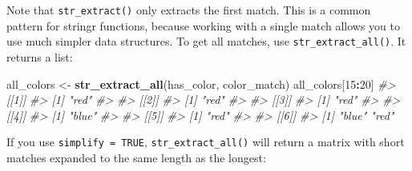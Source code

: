 \documentclass[]{book}
\newenvironment{Shaded}{\begin{snugshade}}{\end{snugshade}}
\newcommand{\CommentTok}[1]{\textcolor[rgb]{0.56,0.35,0.01}{\textit{#1}}}
\newcommand{\DecValTok}[1]{\textcolor[rgb]{0.00,0.00,0.81}{#1}}
\newcommand{\KeywordTok}[1]{\textcolor[rgb]{0.13,0.29,0.53}{\textbf{#1}}}
\newcommand{\NormalTok}[1]{#1}
\newcommand{\OperatorTok}[1]{\textcolor[rgb]{0.81,0.36,0.00}{\textbf{#1}}}
\newcommand{\StringTok}[1]{\textcolor[rgb]{0.31,0.60,0.02}{#1}}
\begin{document}
Note that \texttt{str\_extract()} only extracts the first match. This is a common pattern for stringr functions, because working with a single match allows you to use much simpler data structures. To get all matches, use \texttt{str\_extract\_all()}. It returns a list:

\begin{Shaded}
\begin{Highlighting}[]
\NormalTok{all_colors <-}\StringTok{ }\KeywordTok{str_extract_all}\NormalTok{(has_color, color_match)}
\NormalTok{all_colors[}\DecValTok{15}\OperatorTok{:}\DecValTok{20}\NormalTok{]}
\CommentTok{#> [[1]]}
\CommentTok{#> [1] "red"}
\CommentTok{#> }
\CommentTok{#> [[2]]}
\CommentTok{#> [1] "red"}
\CommentTok{#> }
\CommentTok{#> [[3]]}
\CommentTok{#> [1] "red"}
\CommentTok{#> }
\CommentTok{#> [[4]]}
\CommentTok{#> [1] "blue"}
\CommentTok{#> }
\CommentTok{#> [[5]]}
\CommentTok{#> [1] "red"}
\CommentTok{#> }
\CommentTok{#> [[6]]}
\CommentTok{#> [1] "blue" "red"}
\end{Highlighting}
\end{Shaded}

If you use \texttt{simplify\ =\ TRUE}, \texttt{str\_extract\_all()} will return a matrix with short matches expanded to the same length as the longest:
\end{document}
